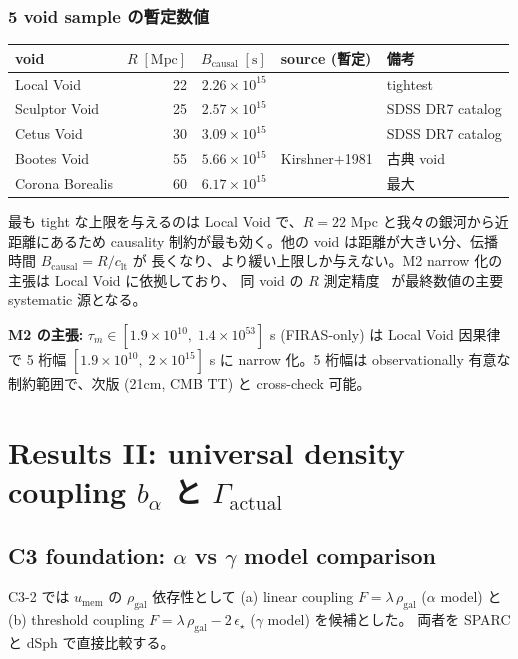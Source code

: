 \documentclass[11pt,a4paper]{ltjsarticle}
\newcommand{\taum}{\tau_{m}}
\newcommand{\bal}{b_{\alpha}}
\newcommand{\umem}{u_{\mathrm{mem}}}
\newcommand{\rhogal}{\rho_{\mathrm{gal}}}
\newcommand{\Gammaact}{\Gamma_{\mathrm{actual}}}
\newcommand{\clt}{c_{\mathrm{lt}}}       %
\begin{document}
\subsubsection{5 void sample の暫定数値}
\begin{center}\small
\begin{tabular}{@{}lrrll@{}}
\toprule
void & $R\;[\mathrm{Mpc}]$ & $B_{\mathrm{causal}}\;[\mathrm{s}]$ & source (暫定) & 備考 \\
\midrule
Local Void & 22 & $2.26 \times 10^{15}$ & \citet{Kreckel2011} & tightest \\
Sculptor Void & 25 & $2.57 \times 10^{15}$ & \citet{Pan2012} & SDSS DR7 catalog \\
Cetus Void & 30 & $3.09 \times 10^{15}$ & \citet{Pan2012} & SDSS DR7 catalog \\
Bootes Void & 55 & $5.66 \times 10^{15}$ & Kirshner+1981 & 古典 void \\
Corona Borealis & 60 & $6.17 \times 10^{15}$ & \citet{Ricciardelli2014} & 最大 \\
\bottomrule
\end{tabular}
\end{center}

最も tight な上限を与えるのは Local Void で、$R = 22$ Mpc と我々の銀河から近距離にあるため
causality 制約が最も効く。他の void は距離が大きい分、伝播時間 $B_{\mathrm{causal}} = R/\clt$ が
長くなり、より緩い上限しか与えない。M2 narrow 化の主張は Local Void に依拠しており、
同 void の $R$ 測定精度~\citep{Kreckel2011} が最終数値の主要 systematic 源となる。

\begin{keybox}
\textbf{M2 の主張:}
$\taum \in [1.9 \times 10^{10},\; 1.4 \times 10^{53}]$ s (FIRAS-only) は Local Void 因果律で
5 桁幅 $[1.9 \times 10^{10},\; 2 \times 10^{15}]$ s に narrow 化。5 桁幅は observationally 有意な
制約範囲で、次版 (21cm, CMB TT) と cross-check 可能。
\end{keybox}

\section{Results II: universal density coupling $\bal$ と $\Gammaact$}

\subsection{C3 foundation: $\alpha$ vs $\gamma$ model comparison}
C3-2 では $\umem$ の $\rhogal$ 依存性として
(a) linear coupling $F = \lambda\,\rhogal$ ($\alpha$ model) と
(b) threshold coupling $F = \lambda\,\rhogal - 2\,\epsilon_\star$ ($\gamma$ model) を候補とした。
両者を SPARC と dSph で直接比較する。
\end{document}
